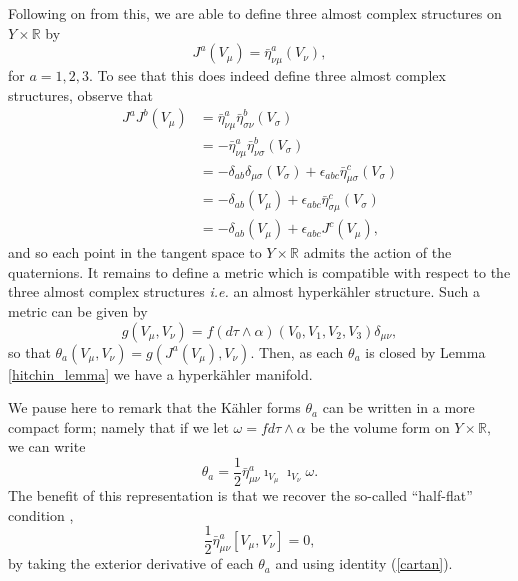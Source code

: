 \documentclass[a4paper,onecolumn,12pt]{article}
\theoremstyle{definition}
\theoremstyle{remark}
\newcommand{\ie}{\emph{i.e.} }
\newcommand{\al}{\alpha}
\newcommand{\m}{\mu}
\newcommand{\n}{\nu}
\newcommand{\tta}[1]{\theta_{#1}}
\newcommand{\K}{K\"ahler }
\newcommand{\HK}{hyperk\"ahler }
\newcommand{\R}{\mathbb{R}}
\newcommand{\hooft}[3]{\bar{\eta}^{#1}_{#2 #3}}
\begin{document}
Following on from this, we are able to define three almost complex structures on $Y\times\R$ by
\begin{equation}
	J^{a}(V_{\m}) = \hooft{a}{\n}{\m}(V_{\n}),
\end{equation}
for $a=1,2,3.$ To see that this does indeed define three almost complex structures, observe that
\begin{align*}
	J^{a}J^{b}(V_{\m}) &= \hooft{a}{\n}{\m}\hooft{b}{\sigma}{\n}(V_{\sigma})\\
	&=-\hooft{a}{\n}{\m}\hooft{b}{\n}{\sigma}(V_{\sigma})\\
	&=-\delta_{ab}\delta_{\m\sigma}(V_{\sigma}) + \epsilon_{abc}\bar{\eta}^{c}_{\m \sigma}(V_{\sigma})\\
	&=-\delta_{ab}(V_{\m}) + \epsilon_{abc}\bar{\eta}^{c}_{\sigma \m}(V_{\sigma})\\
	&=-\delta_{ab}(V_{\m}) + \epsilon_{abc}J^{c}(V_{\m}),
\end{align*}
and so each point in the tangent space to $Y\times\R$ admits the action of the quaternions.
It remains to define a metric which is compatible with respect to the three almost complex structures \ie an almost \HK structure. Such a metric can be given by 
\begin{equation}
	g(V_{\m},V_{\n}) = f(d\tau\wedge\al)(V_{0},V_{1},V_{2},V_{3})\delta_{\m\n},
\end{equation}
so that $\tta{a}(V_{\m},V_{\n}) = g(J^{a}(V_{\m}),V_{\n}).$ Then, as each $\tta{a}$ is closed by Lemma \ref{hitchin_lemma} we have a \HK manifold.

We pause here to remark that the \K forms $\tta{a}$ can be written in a more compact form; namely that if we let $\omega = fd\tau\wedge\alpha$ be the volume form on $Y\times\R,$ we can write
\begin{equation}
	\tta{a} = \frac{1}{2}\hooft{a}{\m}{\n}\imath_{V_{\m}}\imath_{V_{\n}}\omega.
\end{equation}
The benefit of this representation is that we recover the so-called ``half-flat'' condition \cite{ashtekar_1988, hashimoto_1997}, 
\begin{equation}
\label{half_flat}
	\frac{1}{2}\hooft{a}{\m}{\n}[V_{\m},V_{\n}] = 0,
\end{equation}
by taking the exterior derivative of each $\tta{a}$ and using identity (\ref{cartan}). 
\end{document}
